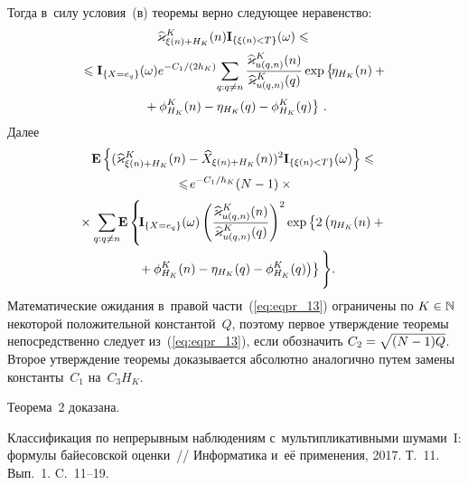 \begin{multicols}{2}
{ Тогда в~силу условия~(в) теоремы верно следующее неравенство:
 \begin{multline*}
\widehat{\varkappa}^K_{\xi(n)+H_K}(n)\mathbf{I}_{\{\xi(n)<T\}}(\omega) \leqslant {}\\[1pt] 
{}\leqslant
\mathbf{I}_{\{X=e_q\}}(\omega) e^{-{C_1}/({2h_K})}\!
\sum\limits_{q:q\neq n} \fr{\widehat{\varkappa}^K_{u(q,n)}(n)}
{\widehat{\varkappa}^K_{u(q,n)}(q)} \exp
\left\{\!
\vphantom{\phi_{H_K}^K(q)}
\eta_{H_K}(n)+{}\right.\\[1pt]
\left.{}+\phi_{H_K}^K(n)-\eta_{H_K}(q)-\phi_{H_K}^K(q)\right\}\,.
 \end{multline*}
 Далее
 \begin{multline}
\mathbf{E}\left\{(\widehat{\varkappa}^K_{\xi(n)+H_K}(n)- 
 \widehat{X}_{\xi(n)+H_K}(n))^2\mathbf{I}_{\{\xi(n)<T\}}(\omega)\right\}
 \leqslant {}\\
 {}\leqslant \!
e^{-{C_1}/{h_K}}(N-1)\times{}\\[2pt]
{}\times\sum\limits_{q:q\neq n}\!\! 
\mathbf{E}\left\{\!\mathbf{I}_{\{X=e_q\}}(\omega)
\left(\fr{\widehat{\varkappa}^K_{u(q,n)}(n)}{\widehat{\varkappa}^K_{u(q,n)}(q)}
\right)^2
\exp\left\{2\left(
\vphantom{\phi_{H_K}^K(q)}
\eta_{H_K}(n)+{}\right.\right.\right.\\
\left.\left.\left.{}+\phi_{H_K}^K(n)-\eta_{H_K}(q)-
\phi_{H_K}^K(q)\right)\right\}
\vphantom{\fr{\widehat{\varkappa}^K_{u(q,n)}(n)}{\widehat{\varkappa}^K_{u(q,n)}(q)}}
\right\}\!.
\label{eq:eqpr_13}
 \end{multline}
 Математические ожидания в~правой части~(\ref{eq:eqpr_13}) ограничены по $K \hm\in 
 \mathbb{N}$ некоторой положительной константой~$Q$, поэтому первое утверждение 
 теоремы непосредственно следует из~(\ref{eq:eqpr_13}), если обозначить\linebreak 
 $C_2 \hm= \sqrt{(N-1)Q}$. Второе утверждение теоремы доказывается абсолютно 
 аналогично путем замены константы~$C_1$ на~$C_3H_K$.
 { %
 
 }

 Теорема~2 доказана.
 
 }


{\small\frenchspacing
 {%
 \begin{thebibliography}{9}
 Классификация по непрерывным наблюдениям с~мультипликативными 
шумами~I: формулы байесовской оценки~// Информатика и~её применения, 2017. 
Т.~11. Вып.~1. C.~11--19.


\end{thebibliography}}}
\end{multicols}
